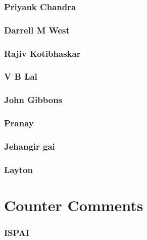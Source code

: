 \documentclass{article}
\begin{document}
\subsubsection{Priyank Chandra}


\subsubsection{Darrell M West}


\subsubsection{Rajiv Kotibhaskar}


\subsubsection{V B Lal}


\subsubsection{John Gibbons}


\subsubsection{Pranay}


\subsubsection{Jehangir gai}


\subsubsection{Layton}


\section{Counter Comments}

\subsubsection{ISPAI}

\end{document}

